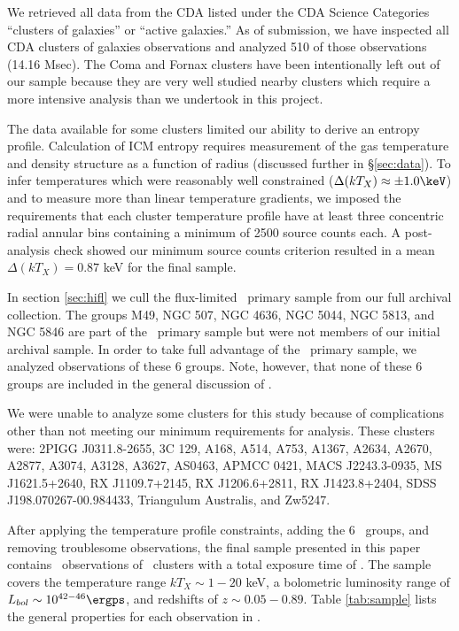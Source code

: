 \documentclass{emulateapj}
\begin{document}
We retrieved all data from the CDA listed under the CDA Science
Categories ``clusters of galaxies'' or ``active galaxies.'' As of
submission, we have inspected all CDA clusters of galaxies
observations and analyzed 510 of those observations (14.16 Msec). The
Coma and Fornax clusters have been intentionally left out of our
sample because they are very well studied nearby clusters which
require a more intensive analysis than we undertook in this project.

The data available for some clusters limited our ability to derive an
entropy profile. Calculation of ICM entropy requires measurement of
the gas temperature and density structure as a function of radius
(discussed further in \S\ref{sec:data}). To infer temperatures which
were reasonably well constrained ($\Delta (kT_X) \approx \pm 1.0
\keV$) and to measure more than linear temperature gradients, we
imposed the requirements that each cluster temperature profile have at
least three concentric radial annular bins containing a minimum of
2500 source counts each. A post-analysis check showed our minimum
source counts criterion resulted in a mean $\Delta (kT_X) = 0.87$ keV
for the final sample.

In section \ref{sec:hifl} we cull the flux-limited \hifl\ primary
sample \citep{hiflugcs1, hiflugcs2} from our full archival
collection. The groups M49, NGC 507, NGC 4636, NGC 5044, NGC 5813, and
NGC 5846 are part of the \hifl\ primary sample but were not members of
our initial archival sample. In order to take full advantage of the
\hifl\ primary sample, we analyzed observations of these 6
groups. Note, however, that none of these 6 groups are included in the
general discussion of
\accept.

We were unable to analyze some clusters for this study because of
complications other than not meeting our minimum requirements for
analysis. These clusters were: 2PIGG J0311.8-2655, 3C 129, A168, A514,
A753, A1367, A2634, A2670, A2877, A3074, A3128, A3627, AS0463, APMCC
0421, MACS J2243.3-0935, MS J1621.5+2640, RX J1109.7+2145, RX
J1206.6+2811, RX J1423.8+2404, SDSS J198.070267-00.984433, Triangulum
Australis, and Zw5247.

After applying the temperature profile constraints, adding the 6
\hifl\ groups, and removing troublesome observations, the final sample
presented in this paper contains \numobs\ observations of
\numcluster\ clusters with a total exposure time of \expt. The sample
covers the temperature range $kT_X \sim 1-20$ keV, a bolometric
luminosity range of $L_{bol} \sim 10^{42-46} \ergps$, and redshifts of
$z \sim 0.05-0.89$. Table \ref{tab:sample} lists the general
properties for each observation in \accept.
\end{document}
